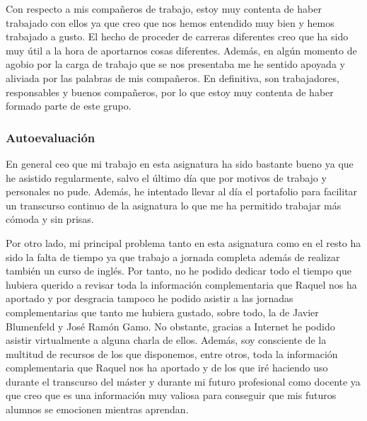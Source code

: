 \begin{leftbar}{\virgicolor}
Con respecto a mis compañeros de trabajo, estoy muy contenta de haber trabajado con ellos ya que creo que nos hemos entendido muy bien y hemos trabajado a gusto.
%
El hecho de proceder de carreras diferentes creo que ha sido muy útil a la hora de aportarnos cosas diferentes.
%
 Además, en algún momento de agobio por la carga de trabajo que se nos presentaba me he sentido apoyada y aliviada por las palabras de mis compañeros.
%
En definitiva, son trabajadores, responsables y buenos compañeros, por lo que estoy muy contenta de haber formado parte de este grupo.



\subsubsection{Autoevaluación}
En general ceo que mi trabajo en esta asignatura ha sido bastante bueno ya que he asistido regularmente, salvo el último día que por motivos de trabajo y personales no pude.
%
Además, he intentado llevar al día el portafolio para facilitar un transcurso continuo de la asignatura lo que me ha permitido trabajar más cómoda y sin prisas.
%


Por otro lado, mi principal problema tanto en esta asignatura como en el resto ha sido la falta de tiempo ya que trabajo a jornada completa además de realizar también un curso de inglés.
%
Por tanto, no he podido dedicar todo el tiempo que hubiera querido a revisar toda la información complementaria que Raquel nos ha aportado y por desgracia tampoco he podido asistir a las jornadas complementarias que tanto me hubiera gustado, sobre todo, la de Javier Blumenfeld y José Ramón Gamo.
%
No obstante, gracias a Internet he podido asistir virtualmente a alguna charla de ellos.
%
Además, soy consciente de la multitud de recursos de los que disponemos, entre otros, toda la información complementaria que Raquel nos ha aportado y de los que iré haciendo uso durante el transcurso del máster y durante mi futuro profesional como docente ya que creo que es una información muy valiosa para conseguir que mis futuros alumnos se emocionen mientras aprendan.


\end{leftbar}


